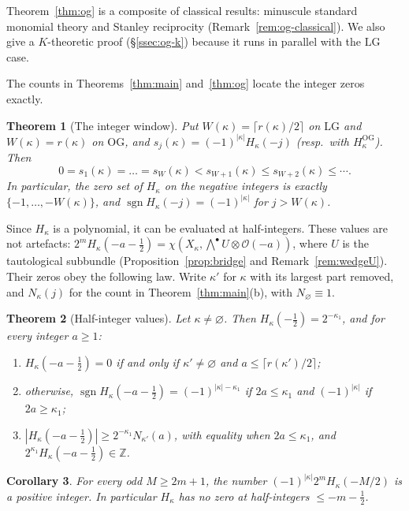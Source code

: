\documentclass[11pt]{amsart}
\newtheorem{theorem}{Theorem}[section]
\newtheorem{corollary}[theorem]{Corollary}
\theoremstyle{definition}
\theoremstyle{remark}
\newcommand{\LG}{\mathrm{LG}}
\newcommand{\OG}{\mathrm{OG}}
\newcommand{\cO}{\mathcal{O}}
\newcommand{\Z}{\mathbb{Z}}
\newcommand{\HOG}{H^{\OG}}
\newcommand{\sgn}{\operatorname{sgn}}
\begin{document}
Theorem~\ref{thm:og} is a composite of classical results: minuscule standard monomial
theory and Stanley reciprocity (Remark~\ref{rem:og-classical}). We also give a $K$-theoretic
proof (\S\ref{ssec:og-k}) because it runs in parallel with the $\LG$ case.

The counts in Theorems~\ref{thm:main} and~\ref{thm:og} locate the integer zeros exactly.

\begin{theorem}[The integer window]\label{thm:window}
Put $W(\kappa)=\lceil r(\kappa)/2\rceil$ on $\LG$ and $W(\kappa)=r(\kappa)$ on $\OG$, and
$s_j(\kappa)=(-1)^{|\kappa|}H_\kappa(-j)$ (resp.\ with $\HOG_\kappa$). Then
\[ 0=s_1(\kappa)=\dots=s_{W}(\kappa)<s_{W+1}(\kappa)\le s_{W+2}(\kappa)\le\cdots. \]
In particular, the zero set of $H_\kappa$ on the negative integers is exactly
$\{-1,\dots,-W(\kappa)\}$, and $\sgn H_\kappa(-j)=(-1)^{|\kappa|}$ for $j>W(\kappa)$.
\end{theorem}

Since $H_\kappa$ is a polynomial, it can be evaluated at half-integers. These values are
not artefacts: $2^mH_\kappa(-a-\tfrac12)=\chi(X_\kappa,\textstyle\bigwedge^{\bullet}U\otimes\cO(-a))$,
where $U$ is the tautological subbundle (Proposition~\ref{prop:bridge} and
Remark~\ref{rem:wedgeU}). Their zeros obey the following law. Write $\kappa'$ for $\kappa$
with its largest part removed, and $N_\kappa(j)$ for the count in
Theorem~\ref{thm:main}(b), with $N_\varnothing\equiv1$.

\begin{theorem}[Half-integer values]\label{thm:HZ}
Let $\kappa\neq\varnothing$. Then $H_\kappa(-\tfrac12)=2^{-\kappa_1}$, and for every
integer $a\ge 1$:
\begin{enumerate}[label=(\roman*)]
\item $H_\kappa(-a-\tfrac12)=0$ if and only if $\kappa'\ne\varnothing$ and
$a\le\lceil r(\kappa')/2\rceil$;
\item otherwise, $\sgn H_\kappa(-a-\tfrac12)=(-1)^{|\kappa|-\kappa_1}$ if $2a\le\kappa_1$
and $(-1)^{|\kappa|}$ if $2a\ge\kappa_1$;
\item $|H_\kappa(-a-\tfrac12)|\ge 2^{-\kappa_1}N_{\kappa'}(a)$, with equality when
$2a\le\kappa_1$, and $2^{\kappa_1}H_\kappa(-a-\tfrac12)\in\Z$.
\end{enumerate}
\end{theorem}

\begin{corollary}\label{cor:OC}
For every odd $M\ge 2m+1$, the number $(-1)^{|\kappa|}2^mH_\kappa(-M/2)$ is a positive
integer. In particular $H_\kappa$ has no zero at half-integers $\le -m-\tfrac12$.
\end{corollary}
\end{document}
